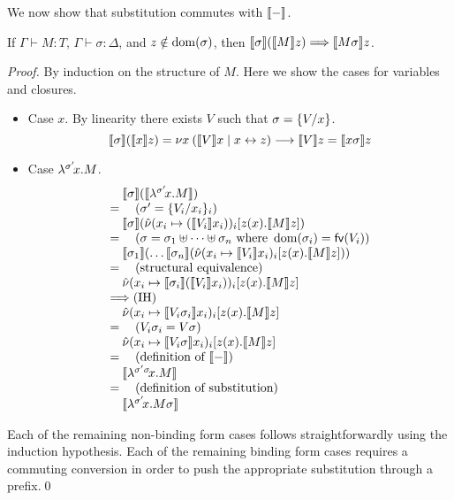\documentclass[oribibl,orivec,envcountsame]{llncs}
\begin{document}
We now show that substitution commutes with $\tocp{-}$.
\begin{lemma}
\label{lem:tocp-subst}
If $\Gamma \vdash M : T$, $\Gamma \vdash \sigma : \Delta$, and $z \notin \dom(\sigma)$, then
$\tocp{\sigma}(\tocp{M}z) \bigrto \tocp{M \sigma}z$.
\end{lemma}
\begin{proof}
By induction on the structure of $M$. Here we show the cases for variables and closures.
\begin{itemize}
\item Case $x$. By linearity there exists $V$ such that $\sigma = \{\bind{x}{V}\}$.
\[
\tocp{\sigma}(\tocp{x}z) =
\cut{x}{}{\tocp{V}x}{\link{x}{z}} \rto \tocp{V}z = \tocp{x \sigma}z
\]
\item Case $\clos{\sigma'}{x}{M}$.
\[
\bl
\quad \tocp{\sigma}(\tocp{\clos{\sigma'}{x}{M}}) \\
= \quad (\sigma' = \{\bind{x_i}{V_i}\}_i) \\
\quad \tocp{\sigma}(\hat{\nu} (x_i \mapsto (\tocp{V_i}x_i))_i[z(x).\tocp{M}z]) \\
= \quad (\sigma = \sigma_1 \uplus \dots \uplus \sigma_n \text{ where } \dom(\sigma_i) = \fv(V_i)) \\
\quad \tocp{\sigma_1}(\dots\tocp{\sigma_n} (\hat{\nu} (x_i \mapsto \tocp{V_i}x_i)_i[z(x).\tocp{M}z])) \\
= \quad (\text{structural equivalence}) \\
\quad \hat{\nu} (x_i \mapsto \tocp{\sigma_i}(\tocp{V_i}x_i))_i[z(x).\tocp{M}z] \\
\bigrto (\text{IH}) \\
\quad \hat{\nu} (x_i \mapsto \tocp{V_i \sigma_i}x_i)_i[z(x).\tocp{M}z] \\
= \quad (V_i \sigma_i = V \sigma) \\
\quad \hat{\nu} (x_i \mapsto \tocp{V_i \sigma}x_i)_i[z(x).\tocp{M}z] \\
= \quad (\text{definition of }\tocp{-}) \\
\quad \tocp{\clos{\sigma' \sigma}{x}{M}} \\
= \quad (\text{definition of substitution}) \\
\quad \tocp{\clos{\sigma'}{x}{M} \sigma} \\
\el
\]
\end{itemize}
Each of the remaining non-binding form cases follows straightforwardly using the induction
hypothesis. Each of the remaining binding form cases requires a commuting conversion in order to
push the appropriate substitution through a prefix.\qed
\end{proof}
\end{document}
